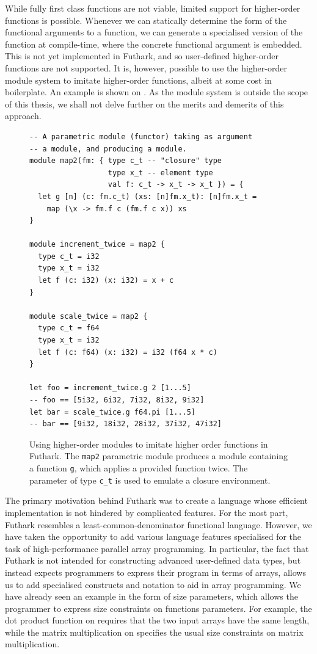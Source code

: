 \begin{description}
  While fully first class functions are not viable, limited support
  for higher-order functions is possible.  Whenever we can statically
  determine the form of the functional arguments to a function, we can
  generate a specialised version of the function at compile-time,
  where the concrete functional argument is embedded.  This is not yet
  implemented in Futhark, and so user-defined higher-order functions
  are not supported.  It is, however, possible to use the higher-order
  module system to imitate higher-order functions, albeit at some cost
  in boilerplate.  An example is shown on .
  As the module system is outside the scope of this thesis, we shall
  not delve further on the merits and demerits of this approach.
\end{description}

\begin{figure}
  \centering
\begin{lstlisting}
-- A parametric module (functor) taking as argument
-- a module, and producing a module.
module map2(fm: { type c_t -- "closure" type
                  type x_t -- element type
                  val f: c_t -> x_t -> x_t }) = {
  let g [n] (c: fm.c_t) (xs: [n]fm.x_t): [n]fm.x_t =
    map (\x -> fm.f c (fm.f c x)) xs
}

module increment_twice = map2 {
  type c_t = i32
  type x_t = i32
  let f (c: i32) (x: i32) = x + c
}

module scale_twice = map2 {
  type c_t = f64
  type x_t = i32
  let f (c: f64) (x: i32) = i32 (f64 x * c)
}

let foo = increment_twice.g 2 [1...5]
-- foo == [5i32, 6i32, 7i32, 8i32, 9i32]
let bar = scale_twice.g f64.pi [1...5]
-- bar == [9i32, 18i32, 28i32, 37i32, 47i32]
\end{lstlisting}
  \caption{Using higher-order modules to imitate higher order
    functions in Futhark.  The \lstinline{map2} parametric module
    produces a module containing a function \lstinline{g}, which
    applies a provided function twice.  The parameter of type
    \lstinline{c_t} is used to emulate a closure environment.}
  \label{fig:faking-hof}
\end{figure}

The primary motivation behind Futhark was to create a language whose
efficient implementation is not hindered by complicated features.  For
the most part, Futhark resembles a least-common-denominator functional
language.  However, we have taken the opportunity to add various
language features specialised for the task of high-performance
parallel array programming.  In particular, the fact that Futhark is
not intended for constructing advanced user-defined data types, but
instead expects programmers to express their program in terms of
arrays, allows us to add specialised constructs and notation to aid in
array programming.  We have already seen an example in the form of
size parameters, which allows the programmer to express size
constraints on functions parameters.  For example, the dot product
function on  requires that the two input
arrays have the same length, while the matrix multiplication on
 specifies the usual size constraints on
matrix multiplication.

